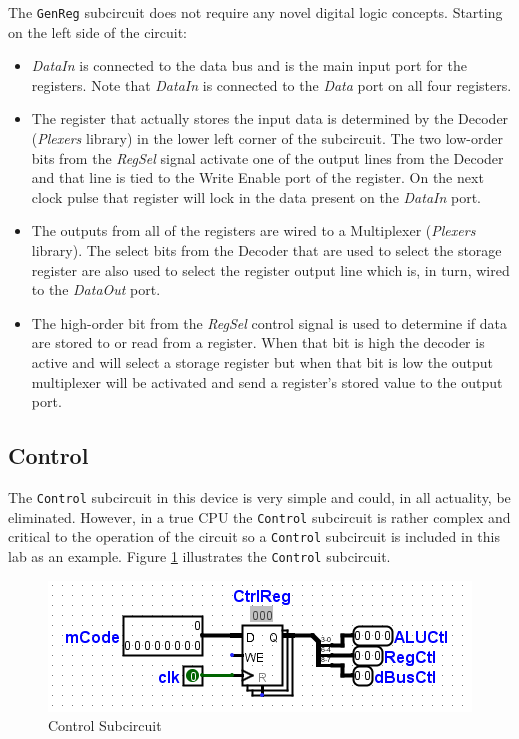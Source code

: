 The \lstinline[columns=fixed]|GenReg| subcircuit does not require any novel digital logic concepts. Starting on the left side of the circuit:

\begin{itemize}
	\item \textit{DataIn} is connected to the data bus and is the main input port for the registers. Note that \textit{DataIn} is connected to the \textit{Data} port on all four registers. 
	\item The register that actually stores the input data is determined by the Decoder (\textit{Plexers} library) in the lower left corner of the subcircuit. The two low-order bits from the \textit{RegSel} signal activate one of the output lines from the Decoder and that line is tied to the Write Enable port of the register. On the next clock pulse that register will lock in the data present on the \textit{DataIn} port.
	\item The outputs from all of the registers are wired to a Multiplexer (\textit{Plexers} library). The select bits from the Decoder that are used to select the storage register are also used to select the register output line which is, in turn, wired to the \textit{DataOut} port.
	\item The high-order bit from the \textit{RegSel} control signal is used to determine if data are stored to or read from a register. When that bit is high the decoder is active and will select a storage register but when that bit is low the output multiplexer will be activated and send a register's stored value to the output port.
\end{itemize}

\subsection{Control}

The \lstinline[columns=fixed]|Control| subcircuit in this device is very simple and could, in all actuality, be eliminated. However, in a true \ac{CPU} the \lstinline[columns=fixed]|Control| subcircuit is rather complex and critical to the operation of the circuit so a \lstinline[columns=fixed]|Control| subcircuit is included in this lab as an example. Figure \ref{fig:11-04} illustrates the \lstinline[columns=fixed]|Control| subcircuit.

\begin{figure}[H]
	\centering
	\includegraphics[width=\maxwidth{.95\linewidth}]{gfx/11-04}
	\caption{Control Subcircuit}
	\label{fig:11-04}
\end{figure}

